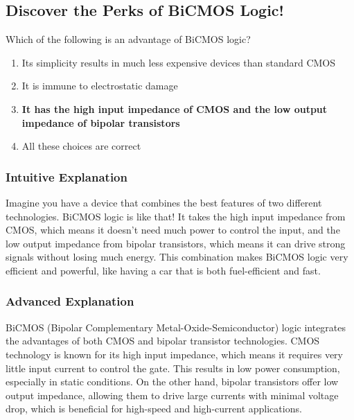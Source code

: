 \subsection{Discover the Perks of BiCMOS Logic!}

\begin{tcolorbox}[colback=gray!10!white,colframe=black!75!black,title=E6C04] Which of the following is an advantage of BiCMOS logic?
    \begin{enumerate}[label=\Alph*),noitemsep]
        \item Its simplicity results in much less expensive devices than standard CMOS
        \item It is immune to electrostatic damage
        \item \textbf{It has the high input impedance of CMOS and the low output impedance of bipolar transistors}
        \item All these choices are correct
    \end{enumerate}
\end{tcolorbox}

\subsubsection{Intuitive Explanation}
Imagine you have a device that combines the best features of two different technologies. BiCMOS logic is like that! It takes the high input impedance from CMOS, which means it doesn't need much power to control the input, and the low output impedance from bipolar transistors, which means it can drive strong signals without losing much energy. This combination makes BiCMOS logic very efficient and powerful, like having a car that is both fuel-efficient and fast.

\subsubsection{Advanced Explanation}
BiCMOS (Bipolar Complementary Metal-Oxide-Semiconductor) logic integrates the advantages of both CMOS and bipolar transistor technologies. CMOS technology is known for its high input impedance, which means it requires very little input current to control the gate. This results in low power consumption, especially in static conditions. On the other hand, bipolar transistors offer low output impedance, allowing them to drive large currents with minimal voltage drop, which is beneficial for high-speed and high-current applications.

